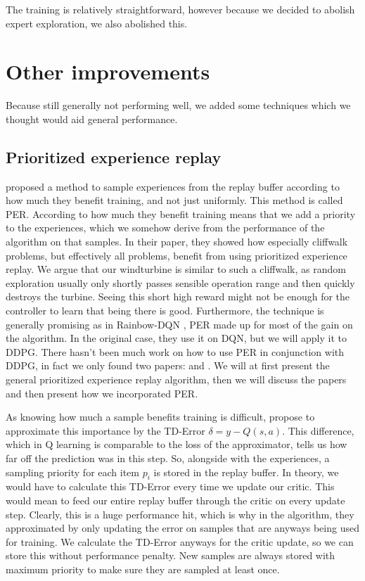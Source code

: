 \documentclass[hyperref,beleg]{cgvpub}
\begin{document}
The training is relatively straightforward, however because we decided to abolish expert exploration, we also abolished this.

\section{Other improvements}

Because still generally not performing well, we added some techniques which we thought would aid general performance.

\subsection{Prioritized experience replay}

\cite{schaulPrioritizedExperienceReplay2016} proposed a method to sample experiences from the replay buffer according to how much they benefit training, and not just uniformly. This method is called \ac{PER}. According to how much they benefit training means that we add a priority to the experiences, which we somehow derive from the performance of the algorithm on that samples. In their paper, they showed how especially cliffwalk problems, but effectively all problems, benefit from using prioritized experience replay. We argue that our windturbine is similar to such a cliffwalk, as random exploration usually only shortly passes sensible operation range and then quickly destroys the turbine. Seeing this short high reward might not be enough for the controller to learn that being there is good. Furthermore, the technique is generally promising as in Rainbow-\ac{DQN} \cite{hesselRainbowCombiningImprovements2017}, \ac{PER} made up for most of the gain on the algorithm. In the original case, they use it on \ac{DQN}, but we will apply it to \ac{DDPG}. There hasn't been much work on how to use \ac{PER} in conjunction with \ac{DDPG}, in fact we only found two papers: \cite{houImprovingDDPGPrioritized} and \cite{zhaExperienceReplayOptimization2019}. We will at first present the general prioritized experience replay algorithm, then we will discuss the papers and then present how we incorporated \ac{PER}.

As knowing how much a sample benefits training is difficult, \cite{schaulPrioritizedExperienceReplay2016} propose to approximate this importance by the \ac{TD-Error} $\delta = y - Q(s, a)$. This difference, which in Q learning is comparable to the loss of the approximator, tells us how far off the prediction was in this step. So, alongside with the experiences, a sampling priority for each item $p_i$ is stored in the replay buffer. In theory, we would have to calculate this \ac{TD-Error} every time we update our critic. This would mean to feed our entire replay buffer through the critic on every update step. Clearly, this is a huge performance hit, which is why in the algorithm, they approximated by only updating the error on samples that are anyways being used for training. We calculate the \ac{TD-Error} anyways for the critic update, so we can store this without performance penalty. New samples are always stored with maximum priority to make sure they are sampled at least once.
\end{document}
